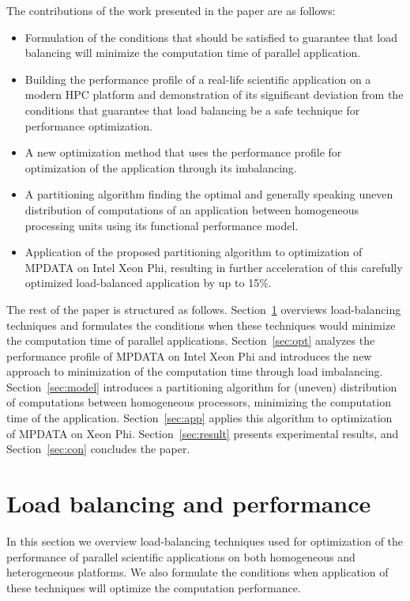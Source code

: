 \documentclass{acm_proc_article-sp}
\begin{document}
The contributions of the work presented in the paper are as follows:
\begin{itemize}
\item Formulation of the conditions that should be satisfied to guarantee that load balancing will minimize the computation time of parallel application.
\item Building the performance profile of a real-life scientific application on a modern HPC platform and demonstration of its significant deviation from the conditions that guarantee that load balancing be a safe technique for performance optimization.
\item A new optimization method that uses the performance profile for optimization of the application through its imbalancing.
\item A partitioning algorithm finding the optimal and generally speaking uneven distribution of computations of an application between homogeneous processing units using its functional performance model.
\item Application of the proposed partitioning algorithm to optimization of MPDATA on Intel Xeon Phi, resulting in further acceleration of this carefully optimized load-balanced application by up to 15\%.
\end{itemize}

The rest of the paper is structured as follows. Section~\ref{sec:per} overviews load-balancing techniques and formulates the conditions when these techniques would minimize the computation time of parallel applications. Section~\ref{sec:opt} analyzes the performance profile of MPDATA on Intel Xeon Phi and introduces the new approach to minimization of the computation time through load imbalancing. Section~\ref{sec:model}  introduces a partitioning algorithm for (uneven) distribution of computations between homogeneous processors, minimizing the computation time of the application. Section~\ref{sec:app} applies this algorithm to optimization of MPDATA on Xeon Phi. Section~\ref{sec:result} presents experimental results, and Section~\ref{sec:con} concludes the paper.


\section{Load balancing and performance}
\label{sec:per}

In this section we overview load-balancing techniques used for optimization of the performance of parallel scientific applications on both homogeneous and heterogeneous platforms. We also formulate the conditions when application of these techniques will optimize the computation performance.
\end{document}
